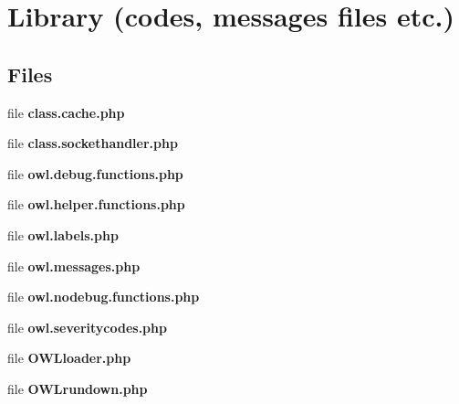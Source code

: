 \section{Library (codes, messages files etc.)}
\label{group__OWL__LIBRARY}
\subsection*{Files}
\begin{DoxyCompactItemize}
\item 
file {\bf class.cache.php}
\item 
file {\bf class.sockethandler.php}
\item 
file {\bf owl.debug.functions.php}
\item 
file {\bf owl.helper.functions.php}
\item 
file {\bf owl.labels.php}
\item 
file {\bf owl.messages.php}
\item 
file {\bf owl.nodebug.functions.php}
\item 
file {\bf owl.severitycodes.php}
\item 
file {\bf OWLloader.php}
\item 
file {\bf OWLrundown.php}
\end{DoxyCompactItemize}
